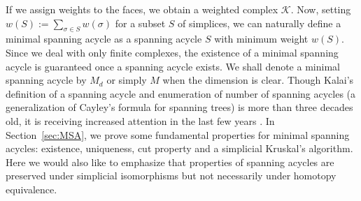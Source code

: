 \documentclass[12pt]{amsart}
\newcommand{\red}[1]{\textcolor{red}{#1}}
\newcommand{\remove}[1]{}
\renewcommand{\red}[1]{#1}
\numberwithin{equation}{section}
\numberwithin{theorem}{section}
\newcommand{\1}{\mathbf{1}}
\def\K{\mathcal{K}}
\def\bF{\mathbb{F}}
\def\bZ{\mathbb{Z}}
\begin{document}
\remove{
\red{It is helpful to consider the definition of a spanning tree via Betti numbers (see Section~\ref{sec:topology} for a more complete introduction). The spanning tree is a set of columns which form a basis for the column space of the incidence matrix or boundary matrix; i.e., the matrix $\partial_1$ whose rows are indexed by vertices and columns by edges such that the $i,j-$th entry is $1$ if the vertex $i$ belongs to the edge $j$ and $0$ otherwise\footnote{For simplicity, we are assuming our underlying field $\bF = \bZ_2$ here, i.e., all vector spaces involved are $\bZ_2$-vector spaces.}. 
}}

If we assign weights to the faces, we obtain a weighted complex $\K.$ Now, setting $w(S) := \sum_{\sigma \in S} w(\sigma)$ for a subset $S$ of simplices, we can naturally define a minimal spanning acycle as a spanning acycle $S$ with minimum weight $w(S)$. Since we deal with only finite complexes, the existence of a minimal spanning acycle is guaranteed once a spanning acycle exists. We shall denote a minimal spanning acycle by $M_d$ or simply $M$ when the dimension is clear. Though Kalai's definition of a spanning acycle and enumeration of number of spanning acycles (a generalization of Cayley's formula for spanning trees) is more than three decades old, it is receiving increased attention in the last few years
\cite{Bajo14,Catanzaro15,Duval09,Duval11,Duval16,Kalisnik17,Krushkal14,hiraoka2015minimum,Hiraoka16,Lyons09,Linial14shadows,Mathew15Hypertrees}.
%
In  Section~\ref{sec:MSA}, we  prove some fundamental properties for minimal spanning acycles: existence, uniqueness, cut property and a simplicial Kruskal's algorithm.  %
Here we would also like to emphasize that properties of spanning acycles are preserved under simplicial isomorphisms but not necessarily under homotopy equivalence. 
\end{document}
